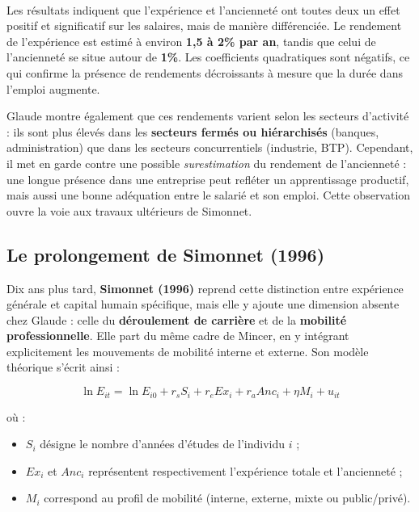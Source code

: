 \documentclass[12pt,a4paper]{article}
\begin{document}
\ 

Les résultats indiquent que l’expérience et l’ancienneté ont toutes deux un effet positif et significatif sur les salaires, mais de manière différenciée.  
Le rendement de l’expérience est estimé à environ \textbf{1,5 à 2\% par an}, tandis que celui de l’ancienneté se situe autour de \textbf{1\%}.  
Les coefficients quadratiques sont négatifs, ce qui confirme la présence de rendements décroissants à mesure que la durée dans l’emploi augmente.  

Glaude montre également que ces rendements varient selon les secteurs d’activité : ils sont plus élevés dans les \textbf{secteurs fermés ou hiérarchisés} (banques, administration) que dans les secteurs concurrentiels (industrie, BTP).  
Cependant, il met en garde contre une possible \textit{surestimation} du rendement de l’ancienneté : une longue présence dans une entreprise peut refléter un apprentissage productif, mais aussi une bonne adéquation entre le salarié et son emploi.  
Cette observation ouvre la voie aux travaux ultérieurs de Simonnet.

\subsection{Le prolongement de Simonnet (1996)}

Dix ans plus tard, \textbf{Simonnet (1996)} reprend cette distinction entre expérience générale et capital humain spécifique, mais elle y ajoute une dimension absente chez Glaude : celle du \textbf{déroulement de carrière} et de la \textbf{mobilité professionnelle}.  
Elle part du même cadre de Mincer, en y intégrant explicitement les mouvements de mobilité interne et externe.  
Son modèle théorique s’écrit ainsi :

\begin{equation}
\ln E_{it} = \ln E_{i0} + r_s S_i + r_e Ex_i + r_a Anc_i + \eta M_i + u_{it}
\end{equation}

où :
\begin{itemize}
    \item $S_i$ désigne le nombre d’années d’études de l’individu $i$ ;
    \item $Ex_i$ et $Anc_i$ représentent respectivement l’expérience totale et l’ancienneté ;
    \item $M_i$ correspond au profil de mobilité (interne, externe, mixte ou public/privé).
\end{itemize}
\end{document}
